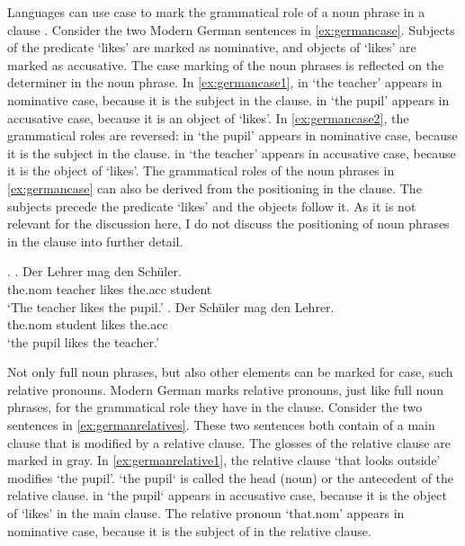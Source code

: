 Languages can use case to mark the grammatical role of a noun phrase in a clause \citep{moravcsik2009}. Consider the two Modern German sentences in \ref{ex:germancase}. Subjects of the predicate  `likes' are marked as nominative, and objects of  `likes' are marked as accusative. The case marking of the noun phrases is reflected on the determiner in the noun phrase.
In \ref{ex:germancase1},  in  `the teacher' appears in nominative case, because it is the subject in the clause.  in  `the pupil' appears in accusative case, because it is an object of  `likes'.
In \ref{ex:germancase2}, the grammatical roles are reversed:  in  `the pupil' appears in nominative case, because it is the subject in the clause.  in  `the teacher' appears in accusative case, because it is the object of  `likes'.
The grammatical roles of the noun phrases in \ref{ex:germancase} can also be derived from the positioning in the clause. The subjects precede the predicate  `likes' and the objects follow it. As it is not relevant for the discussion here, I do not discuss the positioning of noun phrases in the clause into further detail.

\ex.\label{ex:germancase}
\ag. Der Lehrer mag den Schüler.\\
 the.\ac{nom} teacher likes the.\ac{acc} student\\
 `The teacher likes the pupil.'\label{ex:germancase1}
\bg. Der Schüler mag den Lehrer.\\
 the.\ac{nom} student likes the.\ac{acc}\\
 `the pupil likes the teacher.'\label{ex:germancase2}

Not only full noun phrases, but also other elements can be marked for case, such relative pronouns. Modern German marks relative pronouns, just like full noun phrases, for the grammatical role they have in the clause. Consider the two sentences in \ref{ex:germanrelatives}. These two sentences both contain of a main clause that is modified by a relative clause. The glosses of the relative clause are marked in gray.
In \ref{ex:germanrelative1}, the relative clause  `that looks outside' modifies  `the pupil'.  `the pupil` is called the head (noun) or the antecedent of the relative clause.  in  `the pupil` appears in accusative case, because it is the object of  `likes' in the main clause. The relative pronoun  `that.\ac{nom}' appears in nominative case, because it is the subject of in the relative clause.


